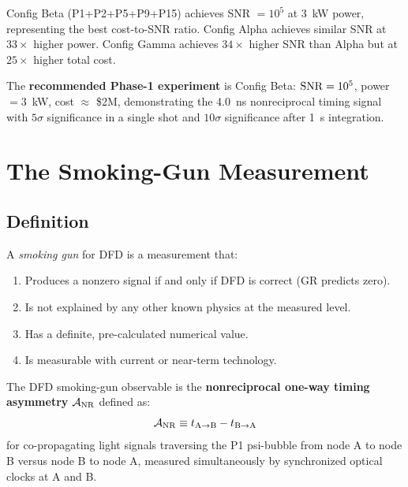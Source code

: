 \begin{proposition}
\label{prop:optimal}
Config Beta (P1+P2+P5+P9+P15) achieves SNR $= 10^5$ at 3~kW power,
representing the best cost-to-SNR ratio. Config Alpha achieves similar
SNR at $33\times$ higher power. Config Gamma achieves $34\times$ higher
SNR than Alpha but at $25\times$ higher total cost.

The \textbf{recommended Phase-1 experiment} is Config Beta:
$\mathrm{SNR} = 10^5$, power $= 3$~kW, cost $\approx$ \$2M, demonstrating
the 4.0~ns nonreciprocal timing signal with $5\sigma$ significance
in a single shot and $10\sigma$ significance after 1~s integration.
\end{proposition}

\section{The Smoking-Gun Measurement}
\label{sec:smoking_gun}

\subsection{Definition}
\label{ssec:def_smoking_gun}

A \emph{smoking gun} for DFD is a measurement that:
\begin{enumerate}[nosep]
\item Produces a nonzero signal if and only if DFD is correct (GR predicts zero).
\item Is not explained by any other known physics at the measured level.
\item Has a definite, pre-calculated numerical value.
\item Is measurable with current or near-term technology.
\end{enumerate}

\begin{definition}
\label{def:smoking_gun}
The DFD smoking-gun observable is the \textbf{nonreciprocal one-way timing
asymmetry} $\mathcal{A}_{\rm NR}$ defined as:
\begin{equation}
\mathcal{A}_{\rm NR} \equiv t_{\rm A\to B} - t_{\rm B\to A}
\label{eq:A_NR}
\end{equation}
for co-propagating light signals traversing the P1 psi-bubble from node
A to node B versus node B to node A, measured simultaneously by
synchronized optical clocks at A and B.
\end{definition}

